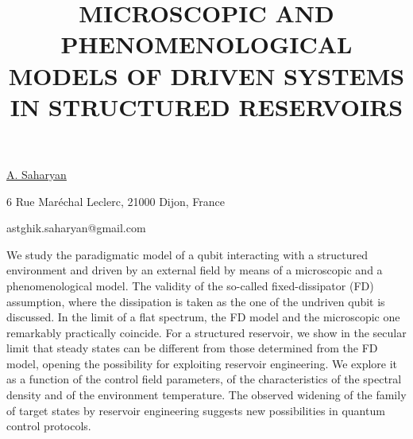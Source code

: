 \title{MICROSCOPIC AND PHENOMENOLOGICAL MODELS OF DRIVEN SYSTEMS IN STRUCTURED RESERVOIRS}

\underline{A. Saharyan}  

{\normalsize{\vspace{-4mm}
6 Rue Maréchal Leclerc,
21000 Dijon,
France 



\email astghik.saharyan@gmail.com}}

We study the paradigmatic model of a qubit interacting with a structured environment and driven by an external field by means of a microscopic and a phenomenological model. The validity of the so-called fixed-dissipator (FD) assumption, where the dissipation is taken as the one of the undriven qubit is discussed. In the limit of a flat spectrum, the FD model and the microscopic one remarkably practically coincide.  For a structured reservoir, we show in the secular limit that steady states can be different from those determined from the FD model, opening the possibility for exploiting reservoir engineering. We explore it as a function of the control field parameters, of the characteristics of the spectral density and of the environment temperature. The observed widening of
the family of target states by reservoir engineering suggests new possibilities in quantum control protocols.

\vspace{\baselineskip}
